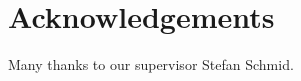 \section{Acknowledgements}\label{sec:acknowledgements}
Many thanks to our supervisor Stefan Schmid.
 